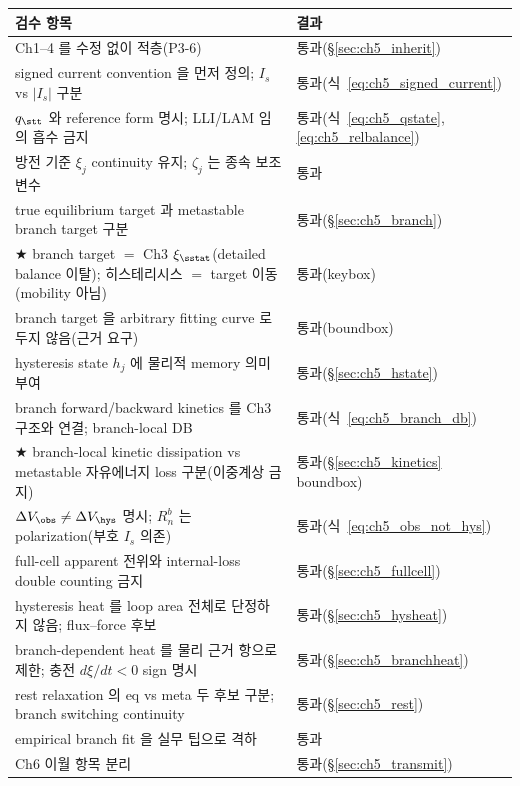 {\small
\begin{longtable}{p{} p{}}
\toprule 검수 항목 & 결과 \\ \midrule \endhead
Ch1--4 를 수정 없이 적층(P3-6) & 통과(\S\ref{sec:ch5_inherit}) \\
signed current convention 을 먼저 정의; $I_s$ vs $|I_s|$ 구분 & 통과(식~\eqref{eq:ch5_signed_current}) \\
$q_\stt$ 와 reference form 명시; LLI/LAM 임의 흡수 금지 & 통과(식~\eqref{eq:ch5_qstate},\eqref{eq:ch5_relbalance}) \\
방전 기준 $\xi_j$ continuity 유지; $\zeta_j$ 는 종속 보조 변수 & 통과 \\
true equilibrium target 과 metastable branch target 구분 & 통과(\S\ref{sec:ch5_branch}) \\
★ branch target $=$ Ch3 $\xi_{\sstat}$(detailed balance 이탈); 히스테리시스 $=$ target 이동(mobility 아님) & 통과(keybox) \\
branch target 을 arbitrary fitting curve 로 두지 않음(근거 요구) & 통과(boundbox) \\
hysteresis state $h_j$ 에 물리적 memory 의미 부여 & 통과(\S\ref{sec:ch5_hstate}) \\
branch forward/backward kinetics 를 Ch3 구조와 연결; branch-local DB & 통과(식~\eqref{eq:ch5_branch_db}) \\
★ branch-local kinetic dissipation vs metastable 자유에너지 loss 구분(이중계상 금지) & 통과(\S\ref{sec:ch5_kinetics} boundbox) \\
$\Delta V_\obs\ne\Delta V_\hys$ 명시; $R_n^b$ 는 polarization(부호 $I_s$ 의존) & 통과(식~\eqref{eq:ch5_obs_not_hys}) \\
full-cell apparent 전위와 internal-loss double counting 금지 & 통과(\S\ref{sec:ch5_fullcell}) \\
hysteresis heat 를 loop area 전체로 단정하지 않음; flux--force 후보 & 통과(\S\ref{sec:ch5_hysheat}) \\
branch-dependent heat 를 물리 근거 항으로 제한; 충전 $d\xi/dt<0$ sign 명시 & 통과(\S\ref{sec:ch5_branchheat}) \\
rest relaxation 의 eq vs meta 두 후보 구분; branch switching continuity & 통과(\S\ref{sec:ch5_rest}) \\
empirical branch fit 을 실무 팁으로 격하 & 통과 \\
Ch6 이월 항목 분리 & 통과(\S\ref{sec:ch5_transmit}) \\
\bottomrule
\end{longtable}
}

